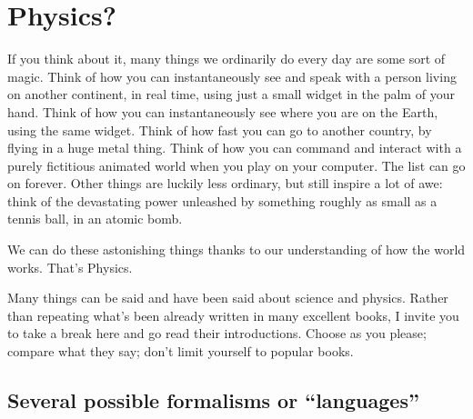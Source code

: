\documentclass[a4paper,12pt,%
onecolumn,oneside,titlepage,%
british%
]{memoir}
\renewcommand*{\|}[1][]{\nonscript\:#1\vert\nonscript\:\mathopen{}}
\begin{document}
\printpagenotes*
\clearpage
\chapter{Physics?}
\label{cha:physics_general}


If you think about it, many things we ordinarily do every day are some sort of magic. Think of how you can instantaneously see and speak with a person living on another continent, in real time, using just a small widget in the palm of your hand. Think of how you can instantaneously see where you are on the Earth, using the same widget. Think of how fast you can go to another country, by flying in a huge metal thing. Think of how you can command and interact with a purely fictitious animated world when you play on your computer. The list can go on forever. Other things are luckily less ordinary, but still inspire a lot of awe: think of the devastating power unleashed by something roughly as small as a tennis ball, in an atomic bomb.

We can do these astonishing things thanks to our understanding of how the world works. That's Physics.

\medskip

Many things can be said and have been said about science and physics. Rather than repeating what's been already written in many excellent books, I invite you to take a break here and go read their introductions. Choose as you please; compare what they say; don't limit yourself to popular books.

\begin{center}
  \textellipsis
  \textellipsis
  \textellipsis
\end{center}


\section{Several possible formalisms or \enquote{languages}}
\label{sec:languages}
\end{document}
